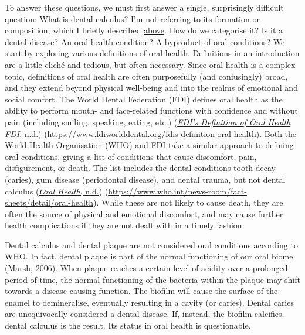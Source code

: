 \documentclass[
  letterpaper,
]{book}
\begin{document}
To answer these questions, we must first answer a single, surprisingly
difficult question: What is dental calculus? I'm not referring to its
formation or composition, which I briefly described
\protect\hyperlink{chap-intro}{above}. How do we categorise it? Is it a
dental disease? An oral health condition? A byproduct of oral
conditions? We start by exploring various definitions of oral health.
Definitions in an introduction are a little cliché and tedious, but
often necessary. Since oral health is a complex topic, definitions of
oral health are often purposefully (and confusingly) broad, and they
extend beyond physical well-being and into the realms of emotional and
social comfort. The World Dental Federation (FDI) defines oral health as
the ability to perform mouth- and face-related functions with confidence
and without pain (including smiling, speaking, eating, etc.)
(\protect\hyperlink{ref-fdiOralHealth}{\emph{{FDI}'s Definition of Oral
Health \textbar{} {FDI}}, n.d.})
(\url{https://www.fdiworlddental.org/fdis-definition-oral-health}). Both
the World Health Organisation (WHO) and FDI take a similar approach to
defining oral conditions, giving a list of conditions that cause
discomfort, pain, disfigurement, or death. The list includes the dental
conditions tooth decay (caries), gum disease (periodontal disease), and
dental trauma, but not dental calculus
(\protect\hyperlink{ref-whoOralHealth}{\emph{Oral Health}, n.d.})
(\url{https://www.who.int/news-room/fact-sheets/detail/oral-health}).
While these are not likely to cause death, they are often the source of
physical and emotional discomfort, and may cause further health
complications if they are not dealt with in a timely fashion.

Dental calculus and dental plaque are not considered oral conditions
according to WHO. In fact, dental plaque is part of the normal
functioning of our oral biome
(\protect\hyperlink{ref-marshDentalPlaque2006}{Marsh, 2006}). When
plaque reaches a certain level of acidity over a prolonged period of
time, the normal functioning of the bacteria within the plaque may shift
towards a disease-causing function. The biofilm will cause the surface
of the enamel to demineralise, eventually resulting in a cavity (or
caries). Dental caries are unequivocally considered a dental disease.
If, instead, the biofilm calcifies, dental calculus is the result. Its
status in oral health is questionable.
\end{document}

